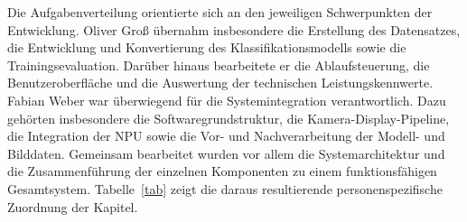 Die Aufgabenverteilung orientierte sich an den jeweiligen Schwerpunkten der Entwicklung. Oliver Groß übernahm insbesondere die Erstellung des Datensatzes, die Entwicklung und Konvertierung des Klassifikationsmodells sowie die Trainingsevaluation. Darüber hinaus bearbeitete er die Ablaufsteuerung, die Benutzeroberfläche und die Auswertung der technischen Leistungskennwerte. Fabian Weber war überwiegend für die Systemintegration verantwortlich. Dazu gehörten insbesondere die Softwaregrundstruktur, die Kamera-Display-Pipeline, die Integration der NPU sowie die Vor- und Nachverarbeitung der Modell- und Bilddaten. Gemeinsam bearbeitet wurden vor allem die Systemarchitektur und die Zusammenführung der einzelnen Komponenten zu einem funktionsfähigen Gesamtsystem. Tabelle~\ref{tab} zeigt die daraus resultierende personenspezifische Zuordnung der Kapitel.

